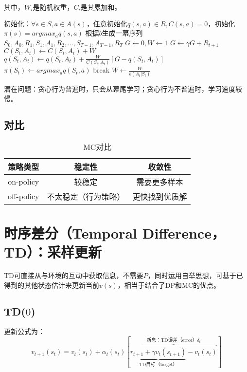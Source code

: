 \documentclass[
12pt, %
a4paper, 
oneside, %
headinclude,footinclude, %
]{scrartcl}
\begin{document}
其中，$ W_i $是随机权重，$ C_i $是其累加和。
\begin{myalgorithm}
\State 初始化：$ \forall s \in S, a \in A(s) $，任意初始化$ q(s,a) \in R, C(s,a) = 0 $，初始化$ \pi(s) = argmax_a q(s,a) $ 
\Loop
\State 根据$ b $生成一幕序列$ S_0, A_0, R_1, S_1, A_1, R_2, \dots, S_{T - 1}, A_{T - 1}, R_T $ 
\State $ G \gets 0, W \gets 1 $
\State $ G \gets \gamma G + R_{t + 1} $
\State $ C(S_t, A_t) \gets C(S_t, A_t) + W $
\State $ q(S_t ,A_t) \gets q(S_t, A_t) + \frac{W}{C(S_t, A_t)}[G - q(S_t, A_t)] $ 
\State $ \pi(S_t) \gets argmax_a q(S_t,a) $
\State break 
\EndIf
\State $ W \gets \frac{W}{b(A_t|S_t)} $ 
\EndFor
\EndLoop
\end{myalgorithm}

潜在问题：贪心行为普遍时，只会从幕尾学习；贪心行为不普遍时，学习速度较慢。
\subsection[对比]{对比}
\begin{table}[H]
\centering
\begin{tabular}{|c|c|c|}
\hline
策略类型 & 稳定性 & 收敛性 \\
\hline
on-policy & 较稳定 & 需要更多样本 \\
\hline
off-policy & 不太稳定（行为策略） & 更快找到优质解 \\
\hline
\end{tabular}
\caption{MC对比}
\end{table}
\section[时序差分]{时序差分（Temporal Difference，TD）：采样更新}
TD可直接从与环境的互动中获取信息，不需要$ P $，同时运用自举思想，可基于已得到的其他状态估计来更新当前$ v(s) $，相当于结合了DP和MC的优点。
\subsection[TD($ 0 $)]{TD($ 0 $)}
更新公式为：
$$ v_{t + 1}(s_t) = v_t(s_t) + \alpha_t(s_t)[\overbrace{\underbrace{r_{t + 1} + \gamma v_t(s_{t + 1})}_{\text{TD目标（target）}} - v_t(s_t)}^{\text{新息：TD误差（error）}\delta_t}] $$
\end{document}
